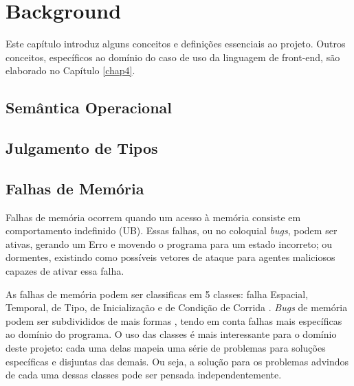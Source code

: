 \chapter{Background}

Este capítulo introduz alguns conceitos e definições essenciais ao projeto. 
Outros conceitos, específicos ao domínio do caso de uso da linguagem de front-end,
são elaborado no Capítulo \ref{chap4}. 

\section{Semântica Operacional}

\section{Julgamento de Tipos}

\section{Falhas de Memória}
\label{sec:mem-error}


Falhas de memória ocorrem quando um acesso à memória consiste em comportamento
indefinido (UB). Essas falhas, ou no coloquial \emph{bugs}, podem ser ativas, 
gerando um Erro e movendo o programa para um estado incorreto; ou dormentes, 
existindo como possíveis vetores de ataque para agentes maliciosos capazes de 
ativar essa falha. 

As falhas de memória podem ser classificas em 5 classes: falha Espacial, 
Temporal, de Tipo, de Inicialização e de Condição de Corrida \cite{Apple22,Google24}.
\emph{Bugs} de memória podem ser subdivididos de mais formas \cite{7KINGDOMS,CWELIST},
tendo em conta falhas mais específicas ao domínio do programa. 
O uso das classes é mais interessante para o domínio deste projeto:
cada uma delas mapeia uma série de problemas para soluções específicas e disjuntas das demais. 
Ou seja, a solução para os problemas advindos de cada uma dessas classes pode ser 
pensada independentemente. 

